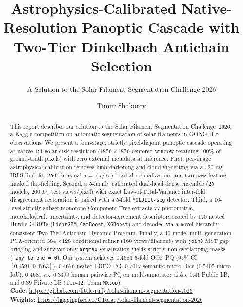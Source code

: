 \documentclass[sigconf]{acmart}
\begin{document}
\title[Native-Resolution Solar Filament Panoptic Cascade]{Astrophysics-Calibrated Native-Resolution Panoptic Cascade with Two-Tier Dinkelbach Antichain Selection}
\subtitle{A Solution to the Solar Filament Segmentation Challenge 2026} %

\author{Timur Shakurov}

\begin{abstract}
    This report describes our solution to the Solar Filament Segmentation Challenge~2026, a Kaggle competition on automatic segmentation of solar filaments in GONG H-$\alpha$ observations. We present a four-stage, strictly pixel-disjoint panoptic cascade operating at native $1{:}1$ solar-disk resolution ($1856\times 1856$ centered window retaining $100\%$ of ground-truth pixels) with zero external metadata at inference. First, per-image astrophysical calibration removes limb darkening and cloud vignetting via a 720-ray IRLS limb fit, 256-bin equal-$u=(r/R)^2$ radial normalization, and two-pass feature-masked flat-fielding. Second, a 5-family calibrated dual-head dense ensemble (25 models, 200 $D_4$ test views/pixel) with exact Law-of-Total-Variance inter-fold disagreement restoration is paired with a 5-fold \texttt{YOLO11l-seg} detector. Third, a 16-level strictly subset-monotone Component Tree extracts 77 photometric, morphological, uncertainty, and detector-agreement descriptors scored by 120 nested Hurdle GBDTs (\texttt{LightGBM}, \texttt{CatBoost}, \texttt{XGBoost}) and decoded via a novel hierarchy-consistent Two-Tier Antichain Dynamic Program. Finally, a 40-model multi-generation PCA-oriented $384\times 128$ conditional refiner (160 views/filament) with \texttt{join3} MST gap bridging and survivor-only \texttt{argmax} serialization yields strictly non-overlapping masks (\texttt{many\_to\_one = 0}). Our system achieves $0.4683$ 5-fold OOF PQ ($95\%$ CI $[0.4591, 0.4763]$), $0.4676$ nested LOFO PQ, $0.7017$ semantic micro-Dice ($0.5405$ micro-IoU), $0.4681$ vs.\ $0.3399$ human pairwise PQ on multi-annotator disks, $0.41$ Public LB, and $0.39$ Private LB (Top-12, Team \texttt{MXlop}).\\
{\footnotesize\textbf{Code:} \url{https://github.com/little-ruffy/solar-filament-segmentation-2026}}\\
{\footnotesize\textbf{Weights:} \url{https://huggingface.co/CToraq/solar-filament-segmentation-2026}}
\end{abstract}

\maketitle
\end{document}
